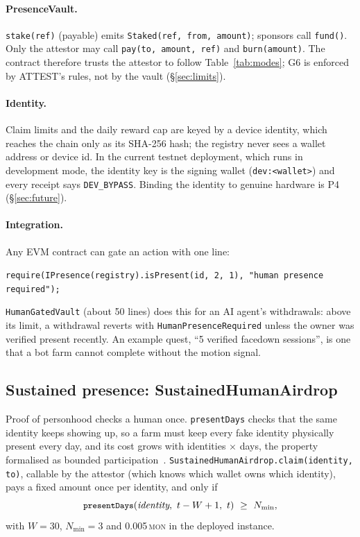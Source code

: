 \documentclass[10pt]{article}
\newcommand{\code}[1]{\texttt{\small #1}}
\newcommand{\mon}{\textsc{mon}}
\begin{document}
\paragraph{PresenceVault.} \code{stake(ref)} (payable) emits \code{Staked(ref, from, amount)}; sponsors call
\code{fund()}. Only the attestor may call \code{pay(to, amount, ref)} and \code{burn(amount)}. The contract therefore
trusts the attestor to follow Table~\ref{tab:modes}; G6 is enforced by ATTEST's rules, not by the vault
(\S\ref{sec:limits}).

\paragraph{Identity.} Claim limits and the daily reward cap are keyed by a device identity, which reaches the chain only
as its SHA-256 hash; the registry never sees a wallet address or device id. In the current testnet deployment, which
runs in development mode, the identity key is the signing wallet (\code{dev:<wallet>}) and every receipt says
\code{DEV\_BYPASS}. Binding the identity to genuine hardware is P4 (\S\ref{sec:future}).

\paragraph{Integration.} Any EVM contract can gate an action with one line:
\begin{center}\code{require(IPresence(registry).isPresent(id, 2, 1), "human presence required");}\end{center} \code{HumanGatedVault} (about 50 lines) does this for an AI
agent's withdrawals: above its limit, a withdrawal reverts with \code{HumanPresenceRequired} unless the owner was
verified present recently. An example quest, ``5 verified facedown sessions'', is one that a bot farm cannot complete
without the motion signal.

\subsection{Sustained presence: SustainedHumanAirdrop}
Proof of personhood checks a human once. \code{presentDays} checks that the same identity keeps showing up, so a farm
must keep every fake identity physically present every day, and its cost grows with identities $\times$ days, the
property formalised as bounded participation~\cite{bpc2026}. \code{SustainedHumanAirdrop.claim(identity, to)}, callable
by the attestor (which knows which wallet owns which identity), pays a fixed amount once per identity, and only if
\begin{equation}
\code{presentDays}(\textit{identity},\ t-W+1,\ t)\ \ge\ N_{\min},
\end{equation}
with $W=30$, $N_{\min}=3$ and 0.005\,\mon{} in the deployed instance.
\end{document}
